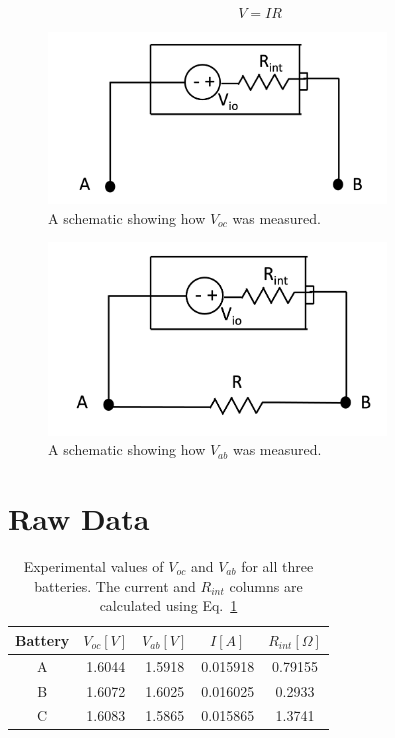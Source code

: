 \documentclass{report}
\begin{document}
    \begin{equation}
        \label{ohms_law}
        V = IR
    \end{equation}
\begin{figure}[htpb]
    \centering
    \includegraphics[width=0.8\textwidth]{SchematicA.png}
    \caption{A schematic showing how $V_{oc}$ was measured.}
    \label{fig:SchemA}
\end{figure}
\begin{figure}[htpb]
    \centering
    \includegraphics[width=0.8\textwidth]{SchematicB.png}
    \caption{A schematic showing how $V_{ab}$ was measured.}
    \label{fig:SchemB}
\end{figure}
\section{Raw Data}
\FloatBarrier
\begin{table}[h!]
    \centering
    \caption{Experimental values of $V_{oc}$ and $V_{ab}$ for all three batteries. The current and $R_{int}$ columns are calculated using Eq.~\ref{}}
    \label{tab:results}
    \begin{tabular}{|c c c c c|}
        \hline
        Battery & $V_{oc} [V]$ & $V_{ab} [V]$ & $ I[A]$ & $R_{int} [\Omega]$\\
        \hline
        A      &   1.6044    &  1.5918     &  0.015918     &  0.79155 \\
        B   & 1.6072    & 1.6025 &  0.016025 & 0.2933 \\
        C   & 1.6083    & 1.5865    & 0.015865  & 1.3741 \\
        \hline

    \end{tabular}
    \end{table}
    \FloatBarrier
\end{document}
